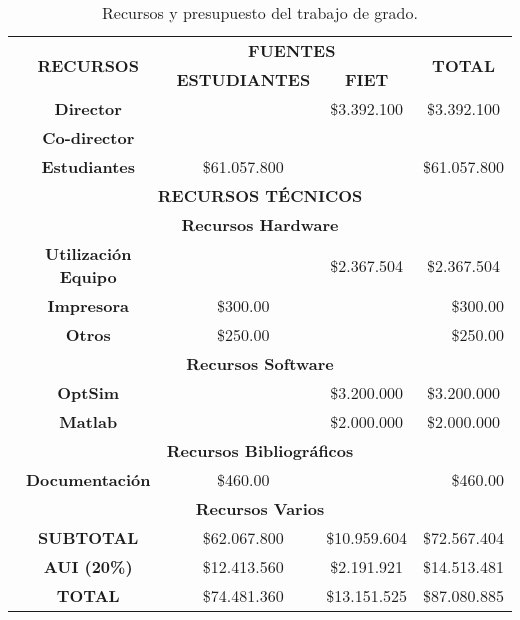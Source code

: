 \begin{table}[htbp]
  \centering
  \caption{Recursos y presupuesto del trabajo de grado.}
  \begin{tabular}{|c|c|c|c|}
    \hline
    \multicolumn{1}{|c|}{\multirow{2}[4]{*}{\textbf{RECURSOS}}} & \multicolumn{2}{c|}{\textbf{FUENTES}} & \multicolumn{1}{c|}{\multirow{2}[4]{*}{\textbf{TOTAL}}} \bigstrut\\
\cline{2-3}          & \multicolumn{1}{c|}{\textbf{ESTUDIANTES}} & \multicolumn{1}{c|}{\textbf{FIET}} &  \bigstrut\\
    \hline
    \textbf{Director} & \multicolumn{1}{r|}{} & \$3.392.100 & \$3.392.100 \bigstrut\\
    \hline
    \textbf{Co-director} & \multicolumn{1}{r|}{} & \multicolumn{1}{r|}{} & \multicolumn{1}{r|}{} \bigstrut\\
    \hline
    \textbf{Estudiantes} & \$61.057.800 & \multicolumn{1}{r|}{} & \$61.057.800 \bigstrut\\
    \hline
    \multicolumn{4}{|c|}{\textbf{RECURSOS TÉCNICOS}} \bigstrut\\
    \hline
    \multicolumn{4}{|c|}{\textbf{Recursos Hardware}} \bigstrut\\
    \hline
    \textbf{Utilización Equipo} & \multicolumn{1}{r|}{} & \$2.367.504 & \$2.367.504 \bigstrut\\
    \hline
    \textbf{Impresora} & \multicolumn{1}{c|}{\$300.00 } & \multicolumn{1}{r|}{} & \multicolumn{1}{r|}{\$300.00 } \bigstrut\\
    \hline
    \textbf{Otros} & \multicolumn{1}{c|}{\$250.00 } & \multicolumn{1}{r|}{} & \multicolumn{1}{r|}{\$250.00 } \bigstrut\\
    \hline
    \multicolumn{4}{|c|}{\textbf{Recursos Software}} \bigstrut\\
    \hline
    \textbf{OptSim} & \multicolumn{1}{r|}{} & \$3.200.000 & \$3.200.000 \bigstrut\\
    \hline
    \textbf{Matlab} & \multicolumn{1}{r|}{} & \$2.000.000 & \$2.000.000 \bigstrut\\
    \hline
    \multicolumn{4}{|c|}{\textbf{Recursos Bibliográficos}} \bigstrut\\
    \hline
    \textbf{Documentación} & \multicolumn{1}{c|}{\$460.00 } & \multicolumn{1}{r|}{} & \multicolumn{1}{r|}{\$460.00 } \bigstrut\\
    \hline
    \multicolumn{4}{|c|}{\textbf{Recursos Varios}} \bigstrut\\
    \hline
    \textbf{SUBTOTAL} & \$62.067.800 & \$10.959.604 & \$72.567.404 \bigstrut\\
    \hline
    \textbf{AUI (20\%)} & \$12.413.560 & \$2.191.921 & \$14.513.481 \bigstrut\\
    \hline
    \textbf{TOTAL} & \$74.481.360 & \$13.151.525 & \$87.080.885 \bigstrut\\
    \hline
    \end{tabular}%
  \label{tab:tbl_recursos}%
\end{table}%
